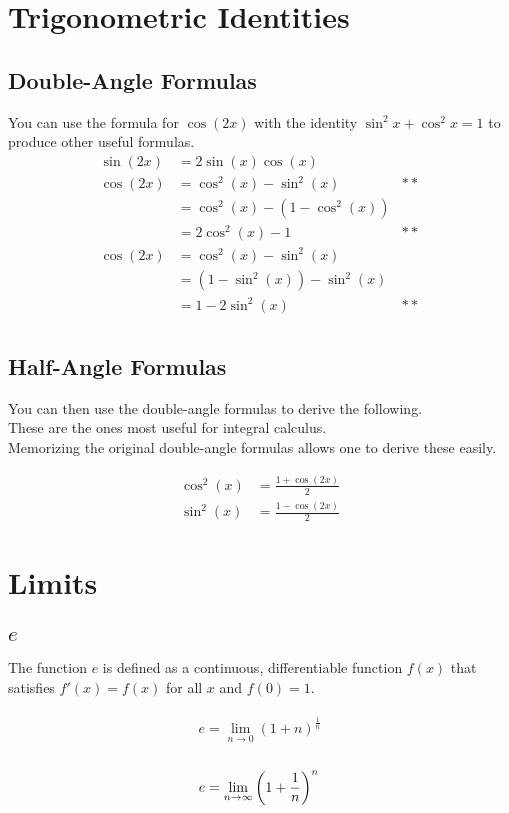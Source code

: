 \documentclass[12pt]{article}
\begin{document}
\section{Trigonometric Identities}


\subsection{Double-Angle Formulas}

You can use the formula for $\cos(2x)$ with the identity $\sin^2x + \cos^2x = 1$ to produce other useful formulas.\\
\begin{align*}
    \sin(2x) &= 2\sin(x)\cos(x)\\
    \cos(2x) &= \cos^2(x) - \sin^2(x)&**\\
    &= \cos^2(x) - (1 - \cos^2(x))\\
    &= 2\cos^2(x) - 1&**\\
    \cos(2x) &= \cos^2(x) - \sin^2(x)\\
    &= (1 - \sin^2(x)) - \sin^2(x)\\
    &= 1 - 2\sin^2(x)&**\\
\end{align*}


\subsection{Half-Angle Formulas}

You can then use the double-angle formulas to derive the following.\\
These are the ones most useful for integral calculus.\\
Memorizing the original double-angle formulas allows one to derive these easily.

\begin{align*}
    \cos^2(x) &= \frac{1+\cos(2x)}{2}\\
    \sin^2(x) &= \frac{1-\cos(2x)}{2}
\end{align*}


\section{Limits}


\subsection{$e$}

The function $e$ is defined as a continuous, differentiable function
$f(x)$ that satisfies $f'(x) = f(x)$ for all $x$ and $f(0) = 1$.\\
\\
\begin{displaymath}
    e = \displaystyle\lim_{n \to 0} \left(1 + n\right)^{\frac{1}{n}}
\end{displaymath}
\\
\begin{displaymath}
    e = \lim_{n \to \infty} \left(1 + \frac{1}{n}\right)^n\\
\end{displaymath}
\end{document}
